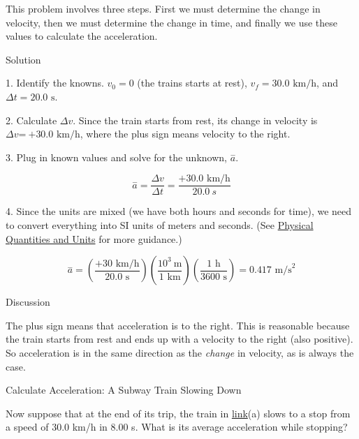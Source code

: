 \documentclass[
]{book}
\newenvironment{tinysection}{}{}
\begin{document}
This problem involves three steps. First we must determine the change in
velocity, then we must determine the change in time, and finally we use
these values to calculate the acceleration.

\begin{tinysection}

{Solution}

\end{tinysection}

1. Identify the knowns. \({v_{0} = 0}{}\) (the trains starts at rest),
\({{v_{f} = \text{30}}\text{.}\text{0\ km/h}}{}\), and
\({{\Delta t = \text{20}}\text{.}\text{0\ s}}{}\).

2. Calculate \({\Delta v}{}\). Since the train starts from rest, its
change in velocity is \(\Delta v\text{=}\ \text{+}\text{30.0\ km/h}\),
where the plus sign means velocity to the right.

3. Plug in known values and solve for the unknown, \(\overset{-}{a}{}\).

\leavevmode\hypertarget{import-auto-id2412947}{}%
\[{{\overset{-}{a} = \frac{\Delta v}{\Delta t}} = \frac{+ \text{30.0\ km/h}}{\text{20}\text{.}0\ s}}{}\]

4. Since the units are mixed (we have both hours and seconds for time),
we need to convert everything into SI units of meters and seconds. (See
\href{/m54765}{Physical Quantities and Units} for more guidance.)

\leavevmode\hypertarget{import-auto-id2297812}{}%
\[{{\overset{-}{a} = \left( \frac{+ \text{30\ km/h}}{\text{20.0\ s}} \right)}\left( \frac{\text{10}^{3}\ \text{m}}{\text{1\ km}} \right){\left( \frac{\text{1\ h}}{\text{3600\ s}} \right) = 0}\text{.}\text{417\ m/s}^{2}}{}\]

\begin{tinysection}

{Discussion}

\end{tinysection}

The plus sign means that acceleration is to the right. This is
reasonable because the train starts from rest and ends up with a
velocity to the right (also positive). So acceleration is in the same
direction as the \emph{change} in velocity, as is always the case.

\hypertarget{fs-id3600466}{}
Calculate Acceleration: A Subway Train Slowing Down

Now suppose that at the end of its trip, the train in
\protect\hyperlink{import-auto-id2590556}{link}(a) slows to a
stop from a speed of 30.0 km/h in 8.00 s. What is its average
acceleration while stopping?
\end{document}
